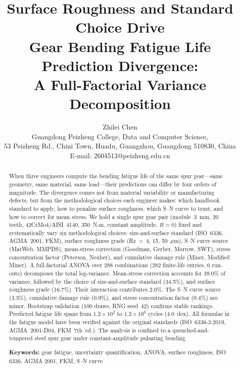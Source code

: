 \documentclass[12pt,a4paper]{article}
\begin{document}
\title{\textbf{Surface Roughness and Standard Choice Drive\\
Gear Bending Fatigue Life Prediction Divergence:\\
A Full-Factorial Variance Decomposition}}

\author{Zhilei Chen\\
Guangdong Peizheng College, Data and Computer Science,\\
53 Peizheng Rd., Chini Town, Huadu, Guangzhou, Guangdong 510830, China\\
E-mail: 2604513@peizheng.edu.cn}

\maketitle

\begin{abstract}
\label{sec:abstract}

When three engineers compute the bending fatigue life of the same spur
gear---same geometry, same material, same load---their predictions can
differ by four orders of magnitude. The divergence comes not from
material variability or manufacturing defects, but from the
methodological choices each engineer makes: which handbook standard to
apply, how to penalize surface roughness, which S--N curve to trust,
and how to correct for mean stress. We hold a single spur gear pair
(module~3~mm, 20 teeth, 42CrMo4/AISI~4140, 350~N$\cdot$m, constant
amplitude, $R=0$) fixed and systematically vary six methodological
choices: size-and-surface standard (ISO~6336, AGMA~2001, FKM), surface
roughness grade (Rz~=~4, 15, 50~$\mu$m), S--N curve source (MatWeb,
MMPDS), mean-stress correction (Goodman, Gerber, Morrow, SWT), stress
concentration factor (Peterson, Neuber), and cumulative damage rule
(Miner, Modified Miner). A full-factorial ANOVA over 288 combinations
(282 finite-life entries, 6 run-outs) decomposes the total log-variance.
Mean-stress correction accounts for 39.0\% of variance, followed by the
choice of size-and-surface standard (34.5\%), and surface roughness
grade (16.7\%). Their interaction contributes 2.0\%. The S--N curve
source (3.3\%), cumulative damage rule (0.9\%), and stress concentration
factor (0.4\%) are minor. Bootstrap validation (100 draws, RNG
seed~42) confirms stable rankings. Predicted fatigue life spans from
$1.2\times10^2$ to $1.2\times10^6$ cycles (4.0~dex). All formulas in
the fatigue model have been verified against the original standards
(ISO~6336-3:2019, AGMA~2001-D04, FKM~7th~ed.). The analysis is
confined to a quenched-and-tempered steel spur gear under
constant-amplitude pulsating bending.

\textbf{Keywords:} gear fatigue, uncertainty quantification, ANOVA,
surface roughness, ISO 6336, AGMA 2001, FKM, S--N curve
\end{abstract}
\end{document}
